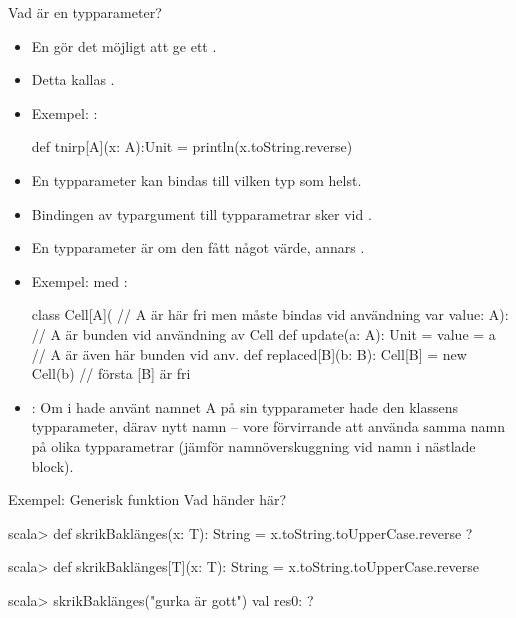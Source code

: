 \begin{Slide}{Vad är en typparameter?}\SlideFontSmall
  \setlength{\leftmargini}{0pt}

\begin{itemize}
\item En  gör det möjligt att ge ett .
\item Detta kallas  .
\item Exempel:  :
\begin{Code}
def tnirp[A](x: A):Unit = println(x.toString.reverse)
\end{Code}
\pause
\item En  typparameter kan bindas till vilken typ som helst.
\item Bindingen av typargument till typparametrar sker vid .
\item En typparameter är  om den  fått något värde, annars . 
\pause
\item Exempel:   med  :
\begin{Code}
class Cell[A](   // A är här fri men måste bindas vid användning 
    var value: A):              // A är bunden vid användning av Cell
  def update(a: A): Unit = value = a    // A är även här bunden vid anv.
  def replaced[B](b: B): Cell[B] = new Cell(b)  // första [B] är fri
\end{Code}
\pause
\item {}: Om  i  hade använt namnet A på sin typparameter hade den  klassens typparameter, därav nytt namn  -- vore förvirrande att använda samma namn på olika typparametrar (jämför  namnöverskuggning vid  namn i nästlade block).
\end{itemize}

\end{Slide}

\ifkompendium\else
\begin{Slide}{Exempel: Generisk funktion}
Vad händer här?
\begin{REPL}

scala> def skrikBaklänges(x: T): String = x.toString.toUpperCase.reverse
?



scala> def skrikBaklänges[T](x: T): String = x.toString.toUpperCase.reverse

scala> skrikBaklänges("gurka är gott")
val res0: ?

\end{REPL}
\end{Slide}


